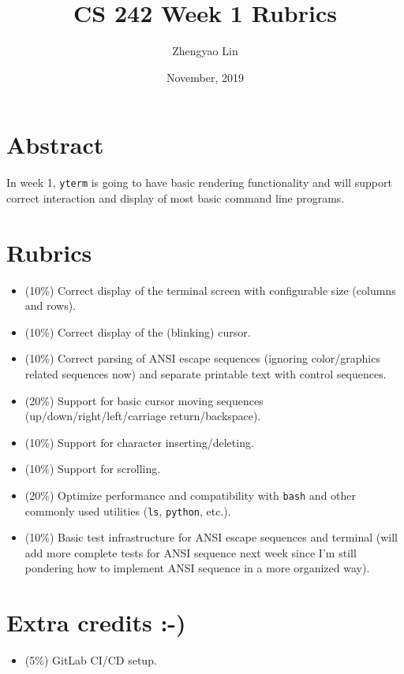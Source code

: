 \documentclass[11pt]{article}
\begin{document}
    \title{CS 242 Week 1 Rubrics}
    \author{Zhengyao Lin}
    \date{November, 2019}
    \maketitle
    
    \section{Abstract}
        In week 1, \texttt{yterm} is going to have basic rendering functionality and will support correct interaction and display of most basic command line programs.
    
    \section{Rubrics}
        \begin{itemize}
            \item (10\%) Correct display of the terminal screen with configurable size (columns and rows).
            \item (10\%) Correct display of the (blinking) cursor.
            \item (10\%) Correct parsing of ANSI escape sequences (ignoring color/graphics related sequences now) and separate printable text with control sequences.
            \item (20\%) Support for basic cursor moving sequences (up/down/right/left/carriage return/backspace).
            \item (10\%) Support for character inserting/deleting.
            \item (10\%) Support for scrolling.
            \item (20\%) Optimize performance and compatibility with \texttt{bash} and other commonly used utilities (\texttt{ls}, \texttt{python}, etc.).
            \item (10\%) Basic test infrastructure for ANSI escape sequences and terminal (will add more complete tests for ANSI sequence next week since I'm still pondering how to implement ANSI sequence in a more organized way).
        \end{itemize}
    
    \section{Extra credits :-)}
        \begin{itemize}
            \item (5\%) GitLab CI/CD setup.
        \end{itemize}
\end{document}
